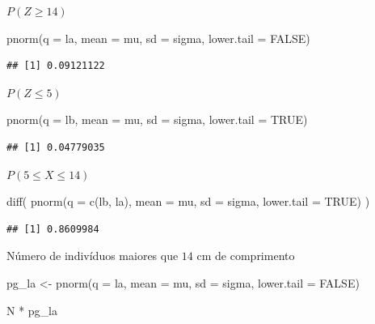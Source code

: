 \documentclass[
]{book}
\newenvironment{Shaded}{\begin{snugshade}}{\end{snugshade}}
\newcommand{\AttributeTok}[1]{\textcolor[rgb]{0.77,0.63,0.00}{#1}}
\newcommand{\ConstantTok}[1]{\textcolor[rgb]{0.00,0.00,0.00}{#1}}
\newcommand{\FunctionTok}[1]{\textcolor[rgb]{0.00,0.00,0.00}{#1}}
\newcommand{\NormalTok}[1]{#1}
\newcommand{\OtherTok}[1]{\textcolor[rgb]{0.56,0.35,0.01}{#1}}
\newcommand{\SpecialCharTok}[1]{\textcolor[rgb]{0.00,0.00,0.00}{#1}}
\begin{document}
\(P(Z \ge 14)\)

\begin{Shaded}
\begin{Highlighting}[]
\FunctionTok{pnorm}\NormalTok{(}\AttributeTok{q =}\NormalTok{ la, }\AttributeTok{mean =}\NormalTok{ mu, }\AttributeTok{sd =}\NormalTok{ sigma, }\AttributeTok{lower.tail =} \ConstantTok{FALSE}\NormalTok{)}
\end{Highlighting}
\end{Shaded}

\begin{verbatim}
## [1] 0.09121122
\end{verbatim}

\(P(Z \le 5)\)

\begin{Shaded}
\begin{Highlighting}[]
\FunctionTok{pnorm}\NormalTok{(}\AttributeTok{q =}\NormalTok{ lb, }\AttributeTok{mean =}\NormalTok{ mu, }\AttributeTok{sd =}\NormalTok{ sigma, }\AttributeTok{lower.tail =} \ConstantTok{TRUE}\NormalTok{)}
\end{Highlighting}
\end{Shaded}

\begin{verbatim}
## [1] 0.04779035
\end{verbatim}

\(P(5 \le X \le 14)\)

\begin{Shaded}
\begin{Highlighting}[]
\FunctionTok{diff}\NormalTok{(}
   \FunctionTok{pnorm}\NormalTok{(}\AttributeTok{q =} \FunctionTok{c}\NormalTok{(lb, la),}
         \AttributeTok{mean =}\NormalTok{ mu,}
         \AttributeTok{sd =}\NormalTok{ sigma,}
         \AttributeTok{lower.tail =} \ConstantTok{TRUE}\NormalTok{)}
\NormalTok{   )}
\end{Highlighting}
\end{Shaded}

\begin{verbatim}
## [1] 0.8609984
\end{verbatim}

Número de indivíduos maiores que \(14\) cm de comprimento

\begin{Shaded}
\begin{Highlighting}[]
\NormalTok{pg\_la }\OtherTok{\textless{}{-}} \FunctionTok{pnorm}\NormalTok{(}\AttributeTok{q =}\NormalTok{ la, }\AttributeTok{mean =}\NormalTok{ mu, }\AttributeTok{sd =}\NormalTok{ sigma, }\AttributeTok{lower.tail =} \ConstantTok{FALSE}\NormalTok{)}

\NormalTok{N }\SpecialCharTok{*}\NormalTok{ pg\_la}
\end{Highlighting}
\end{Shaded}
\end{document}
